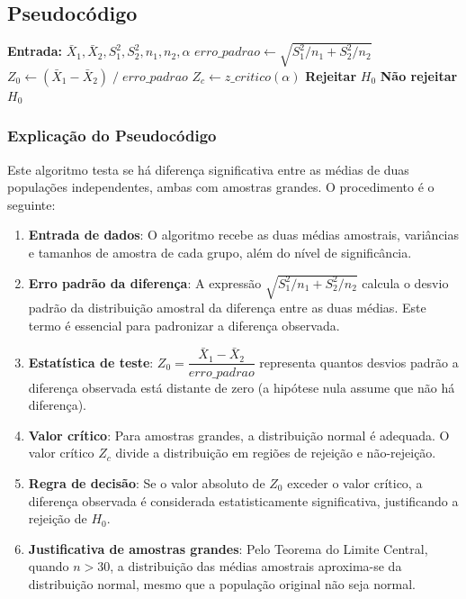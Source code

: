 \documentclass[12pt,a4paper]{article}
\begin{document}
\subsection*{Pseudocódigo}

\begin{algorithm}[H]
\caption{Teste $Z$ -- Diferença entre Médias (Amostras Grandes)}
\begin{algorithmic}[1]
  \State \textbf{Entrada:} $\bar{X}_1, \bar{X}_2, S_1^2, S_2^2, n_1, n_2, \alpha$
  \State $erro\_padrao \gets \sqrt{S_1^2 / n_1 + S_2^2 / n_2}$
  \State $Z_0 \gets (\bar{X}_1 - \bar{X}_2) \;/\; erro\_padrao$
  \State $Z_c \gets z\_critico(\alpha)$ 
    \State \textbf{Rejeitar} $H_0$
  \Else
    \State \textbf{Não rejeitar} $H_0$
  \EndIf
\end{algorithmic}
\end{algorithm}

\subsubsection*{Explicação do Pseudocódigo}

Este algoritmo testa se há diferença significativa entre as médias de duas populações
independentes, ambas com amostras grandes. O procedimento é o seguinte:

\begin{enumerate}
  \item \textbf{Entrada de dados}: O algoritmo recebe as duas médias amostrais, variâncias
  e tamanhos de amostra de cada grupo, além do nível de significância.

  \item \textbf{Erro padrão da diferença}: A expressão $\sqrt{S_1^2 / n_1 + S_2^2 / n_2}$
  calcula o desvio padrão da distribuição amostral da diferença entre as duas médias.
  Este termo é essencial para padronizar a diferença observada.

  \item \textbf{Estatística de teste}: $Z_0 = \dfrac{\bar{X}_1 - \bar{X}_2}{erro\_padrao}$
  representa quantos desvios padrão a diferença observada está distante de zero
  (a hipótese nula assume que não há diferença).

  \item \textbf{Valor crítico}: Para amostras grandes, a distribuição normal é adequada.
  O valor crítico $Z_c$ divide a distribuição em regiões de rejeição e não-rejeição.

  \item \textbf{Regra de decisão}: Se o valor absoluto de $Z_0$ exceder o valor crítico,
  a diferença observada é considerada estatisticamente significativa, justificando a rejeição de $H_0$.

  \item \textbf{Justificativa de amostras grandes}: Pelo Teorema do Limite Central, quando
  $n > 30$, a distribuição das médias amostrais aproxima-se da distribuição normal, mesmo que
  a população original não seja normal.
\end{enumerate}
\end{document}
